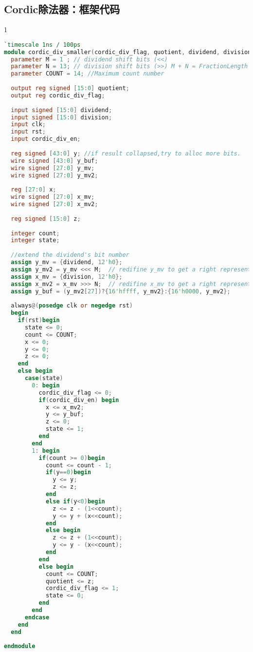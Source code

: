 \subsection{Cordic除法器：框架代码}
\begin{spacing}{1}
\begin{lstlisting}[language=Verilog]
`timescale 1ns / 100ps
module cordic_div_smaller(cordic_div_flag, quotient, dividend, division, clk, rst, cordic_div_en);
  parameter M = 1 ; // dividend shift bits (<<) 
  parameter N = 13; // division shift bits (>>) M + N = FractionLength
  parameter COUNT = 14; //Maximum count number
  
  output reg signed [15:0] quotient;
  output reg cordic_div_flag;
  
  input signed [15:0] dividend;
  input signed [15:0] division;
  input clk;
  input rst;
  input cordic_div_en;
  
  reg signed [43:0] y; //if result collapsed,try to alloc more bits.
  wire signed [43:0] y_buf;
  wire signed [27:0] y_mv;
  wire signed [27:0] y_mv2;
  
  reg [27:0] x;
  wire signed [27:0] x_mv;
  wire signed [27:0] x_mv2;
  
  reg signed [15:0] z;
  
  integer count;
  integer state;
  
  //extend the dividend's bit number
  assign y_mv = {dividend, 12'h0};
  assign y_mv2 = y_mv <<< M;  // redifine y_mv to get a right representation of z
  assign x_mv = {division, 12'h0};
  assign x_mv2 = x_mv >>> N;  // redifine x_mv to get a right representation of z
  assign y_buf = (y_mv2[27])?{16'hffff, y_mv2}:{16'h0000, y_mv2}; 
  
  always@(posedge clk or negedge rst)
  begin
    if(rst)begin
      state <= 0;
      count <= COUNT;
      x <= 0;
      y <= 0;
      z <= 0;
    end
    else begin
      case(state)
        0: begin
          cordic_div_flag <= 0;
          if(cordic_div_en) begin
            x <= x_mv2;
            y <= y_buf;
            z <= 0;
            state <= 1;
          end
        end
        1: begin
          if(count >= 0)begin
            count <= count - 1;
            if(y==0)begin
              y <= y;
              z <= z;
            end
            else if(y<0)begin
              z <= z - (1<<count);
              y <= y + (x<<count);
            end
            else begin
              z <= z + (1<<count);
              y <= y - (x<<count);
            end 
          end
          else begin
            count <= COUNT;
            quotient <= z;
            cordic_div_flag <= 1;
            state <= 0;
          end
        end
      endcase
    end
  end
  
endmodule

\end{lstlisting}
\end{spacing}


